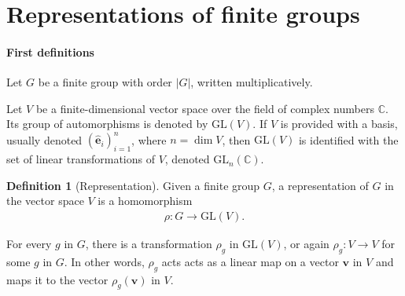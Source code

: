 \documentclass[12pt, a4paper, twoside]{article}
\theoremstyle{definition}
\newtheorem{definition}{Definition}[section]
\theoremstyle{remark}
\numberwithin{equation}{section}
\newcommand{\CC}{\mathbb{C}}
\newcommand{\1}{\mathbf{1}}
\newcommand{\0}{\mathbf{0}}
\newcommand{\GL}{\text{GL}}
\newcommand{\bas}{\mathbf{\hat{e}}}
\newcommand{\vvec}{\mathbf{v}}
\begin{document}





\clearpage{\thispagestyle{empty}\cleardoublepage}
{\hypersetup{linkcolor=black}
\tableofcontents
}

%


\section{Representations of finite groups}

\paragraph{First definitions}

	Let $G$ be a finite group with order $|G|$, written multiplicatively.
	
	Let $V$ be a finite-dimensional vector space over the field of complex numbers $\CC$. Its group of automorphisms is denoted by $\GL(V)$. If $V$ is provided with a basis, usually denoted $(\bas_i)_{i=1}^n$, where $n = \dim V$, then $\GL(V)$ is identified with the set of linear transformations of $V$, denoted $\GL_n(\CC)$\cite[18.1]{DummitFoote}.
	
	\begin{definition}[Representation]\cite{Serre}
		Given a finite group $G$, a representation of $G$ in the vector space $V$ is a homomorphism
		\begin{align*}
			\rho: G \rightarrow \GL(V).
		\end{align*}
	\end{definition}
	For every $g$ in $G$, there is a transformation $\rho_g$ in $\GL(V)$, or again $\rho_g: V \rightarrow V$ for some $g$ in $G$. In other words, $\rho_g$ acts acts as a linear map on a vector $\vvec$ in $V$ and maps it to the vector $\rho_g(\vvec)$ in $V$.
	
\end{document}
